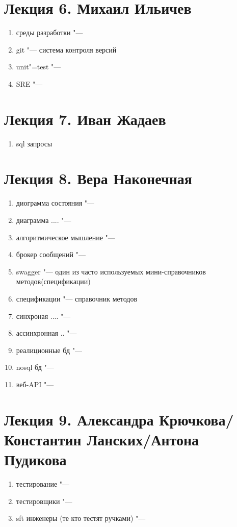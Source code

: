 \documentclass{article}
\begin{document}
\section{Лекция 6. Михаил Ильичев}
\begin{enumerate}
    \item среды разработки "--- 
    \item git "---  система контроля версий
    \item unit"=test "---  
    \item SRE "--- 
\end{enumerate}

\section{Лекция 7. Иван Жадаев}
\begin{enumerate}
    \item sql запросы
\end{enumerate}


\section{Лекция 8. Вера Наконечная}
\begin{enumerate}
    \item диограмма состояния "---
    \item диаграмма .... "--- 
    \item алгоритмическое мышление "---
    \item брокер сообщений "---
    \item swagger "--- один из часто используемых мини-справочников методов(спецификации)
    \item спецификации "--- справочник методов
    \item синхроная .... "---
    \item ассинхронная .. "---
    \item реалиционные бд "---
    \item nosql бд "---
    \item веб-API "---
\end{enumerate}

\section{Лекция 9. Александра Крючкова/Константин Ланских/Антона Пудикова}
\begin{enumerate}
    \item тестирование "---
    \item тестировщики "---
    \item sft инженеры (те кто тестят ручками) "---
\end{enumerate}
\end{document}
